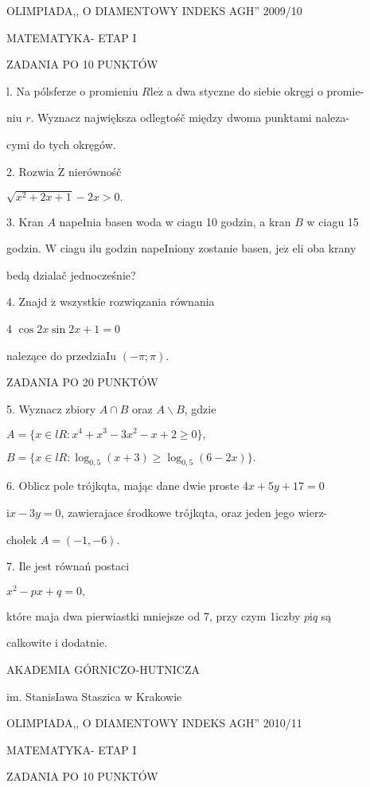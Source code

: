 \documentclass[a4paper,12pt]{article}
\begin{document}
OLIMPIADA,, O DIAMENTOWY INDEKS AGH'' 2009/10

MATEMATYKA- ETAP I

ZADANIA PO 10 PUNKTÓW

l. Na pólsferze o promieniu $R\mathrm{l}\mathrm{e}\dot{\mathrm{z}}$ a dwa styczne do siebie okręgi o promie-

niu $r$. Wyznacz największa odlegtośč między dwoma punktami naleza-

cymi do tych okręgów.

2. Rozwia $\dot{\mathrm{Z}}$ nierównośč

$\sqrt{x^{2}+2x+1}-2x>0.$

3. Kran $A$ napeInia basen woda w ciagu 10 godzin, a kran $B$ w ciagu 15

godzin. $\mathrm{W}$ ciagu ilu godzin napeIniony zostanie basen, $\mathrm{j}\mathrm{e}\dot{\mathrm{z}}$ eli oba krany

bedą dzialač jednocześnie?

4. Znajd $\acute{\mathrm{z}}$ wszystkie rozwiqzania równania

4 $\cos 2x\sin 2x+1=0$

nalezące do przedziaIu $(-\pi;\pi).$

ZADANIA PO 20 PUNKTÓW

5. Wyznacz zbiory $A\cap B$ oraz $A\backslash B$, gdzie

$A=\{x\in lR:x^{4}+x^{3}-3x^{2}-x+2\geq 0\},$

$B=\{x\in lR:\log_{0,5}(x+3)\geq\log_{0,5}(6-2x)\}.$

6. Oblicz pole trójkqta, mając dane dwie proste $4x+5y+17 = 0$

$\mathrm{i} x-3y=0$, zawierajace środkowe trójkqta, oraz jeden jego wierz-

cholek $A=(-1,-6).$

7. Ile jest równań postaci

$x^{2}-px+q=0,$

które maja dwa pierwiastki mniejsze od 7, przy czym 1iczby $p\mathrm{i}q$ są

calkowite i dodatnie.






AKADEMIA GÓRNICZO-HUTNICZA

im. StanisIawa Staszica w Krakowie

OLIMPIADA,, O DIAMENTOWY INDEKS AGH'' 2010/11

MATEMATYKA- ETAP I

ZADANIA PO 10 PUNKTÓW
\end{document}
